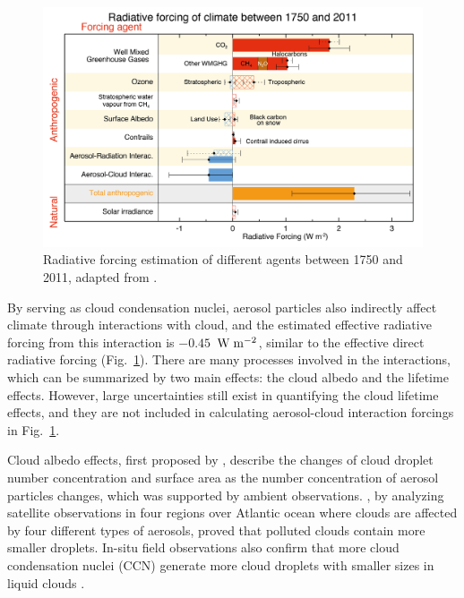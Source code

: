 \documentclass[edeposit,fullpage]{uiucthesis2009}
\makeatletter
\DeclareRobustCommand*\unit[1]
 {\ensuremath{%
   {\thinmuskip3mu\relax
    \def\mu{\text{\textmu}}\def~{\,}%
    \ifx\f@series\testbx\mathbf{#1}\else\mathrm{#1}\fi}}}
\makeatother
\begin{document}
\begin{figure}
	\centering
	\includegraphics[scale=0.80]{chap1_figs/thesis_chap1_fig1.jpeg}
	\caption{Radiative forcing estimation of different agents between 1750 and 2011, adapted from \cite{IPCC_CHAPTER8}.}
	\label{fig:chap1-aerosol-climate}
\end{figure}

By serving as cloud condensation nuclei, aerosol particles also
indirectly affect climate through interactions with cloud, and the
estimated effective radiative forcing from this interaction is
$-0.45$~\unit{W\;m^{-2}}, similar to the effective direct radiative
forcing (Fig.~\ref{fig:chap1-aerosol-climate}). There are many
processes involved in the interactions, which can be summarized by two
main effects: the cloud albedo and the lifetime effects. However,
large uncertainties still exist in quantifying the cloud lifetime
effects, and they are not included in calculating aerosol-cloud
interaction forcings in Fig.~\ref{fig:chap1-aerosol-climate}.

Cloud albedo effects, first proposed by \citet{twomey1977influence},
describe the changes of cloud droplet number concentration and surface
area as the number concentration of aerosol particles changes, which
was supported by ambient observations. \citet{kaufman2005effect}, by
analyzing satellite observations in four regions over Atlantic ocean
where clouds are affected by four different types of aerosols, proved
that polluted clouds contain more smaller droplets. In-situ field
observations also confirm that more cloud condensation nuclei (CCN)
generate more cloud droplets with smaller sizes in liquid clouds
\citep{jia2019distinct,kleinman2012aerosol}.
\end{document}
